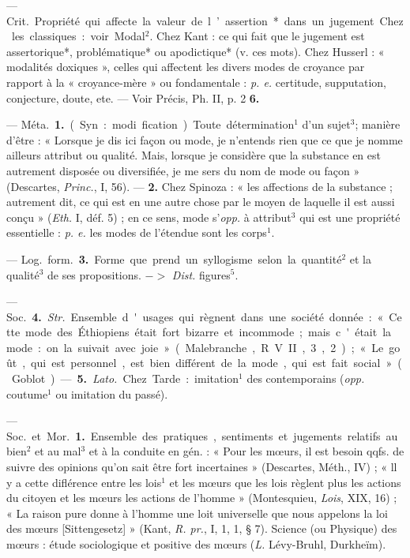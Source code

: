 \begin{itemize}[leftmargin=1cm, label=, itemsep=1pt]
 — \si{Crit.} Propriété qui affecte
la valeur de l’assertion* dans un
jugement. Chez les classiques : voir
Modal$^2$. Chez Kant : ce qui fait que
le jugement est assertorique*, problématique* ou apodictique* (v. ces
mots). Chez Husserl : « modalités
doxiques », celles qui affectent les
divers modes de croyance par rapport à la « croyance-mère » ou fondamentale : {\it p. e.} certitude, supputation, conjecture, doute, ete. — Voir
Précis, Ph. II, p. 2 {\bf 6.}

 — \si{Méta.} {\bf 1.} (Syn. : modi
fication). Toute détermination$^1$ d’un
sujet$^3$; manière d’être : « Lorsque je
dis ici façon ou mode, je n’entends
rien que ce que je nomme ailleurs
attribut ou qualité. Mais, lorsque je
considère que la substance en est autrement disposée ou diversifiée, je
me sers du nom de mode ou façon »
(Descartes, {\it Princ.}, I, 56). — {\bf 2.} Chez
Spinoza : « les affections de la substance ; autrement dit, ce qui est en
une autre chose par le moyen de
laquelle il est aussi conçu » ({\it Eth.} I,
déf. 5) ; en ce sens, mode s’{\it opp.} à
attribut$^3$ qui est une propriété essentielle : {\it p. e.} les modes de l'étendue
sont les corps$^1$.

— \si{Log.} \si{form.} {\bf 3.} Forme que prend
un syllogisme selon la quantité$^2$ et
la qualité$^3$ de ses propositions.
$->$ {\it Dist.} figures$^5$.

 — \si{Soc.} {\bf 4.} {\it Str.} Ensemble
d'usages qui règnent dans une société
donnée : « Cette mode des
Éthiopiens était fort bizarre et
incommode; mais c'était la mode :
on la suivait avec joie » (Malebranche, R. V. II, 3, 2) ; « Le goût,
qui est personnel, est bien différent
de la mode, qui est fait social »
(Goblot). — {\bf 5.} {\it Lato.} Chez Tarde : imitation$^1$ des contemporains
({\it opp.} coutume$^1$ ou imitation du
passé).

 — \si{Soc.} et \si{Mor.} {\bf 1.} Ensemble
des pratiques, sentiments et jugements relatifs au bien$^2$ et au mal$^3$
et à la conduite en gén. : « Pour les
mœurs, il est besoin qqfs. de suivre
des opinions qu'on sait être fort
incertaines » (Descartes, Méth., IV) ;
« ll y a cette diflérence entre les
lois$^1$ et les mœurs que les lois règlent
plus les actions du citoyen et les
mœurs les actions de l’homme »
(Montesquieu, {\it Lois}, XIX, 16) ; « La
raison pure donne à l’homme une
loit universelle que nous appelons
la loi des mœurs [Sittengesetz] »
(Kant, {\it R. pr.}, I, 1, 1, § 7). Science
(ou Physique) des mœurs : étude
sociologique et positive des mœurs
({\it L.} Lévy-Bruhl, Durkheïm).


\end{itemize}
